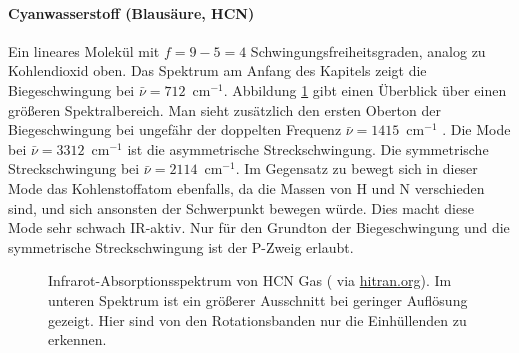 \paragraph{Cyanwasserstoff (Blausäure, HCN)}  
\begin{marginfigure}
\end{marginfigure}
Ein lineares Molekül mit $f=9 - 5 = 4$ Schwingungsfreiheitsgraden, analog zu Kohlendioxid oben. Das Spektrum am Anfang des Kapitels zeigt die Biegeschwingung bei $\bar{\nu} = 712$~cm$^{-1}$.  Abbildung \ref{fig:vib_hcn_all} gibt einen Überblick über einen größeren Spektralbereich. Man sieht zusätzlich den 
ersten Oberton der Biegeschwingung bei ungefähr der doppelten Frequenz  $\bar{\nu} = 1415$~cm$^{-1}$
. Die Mode bei  $\bar{\nu} = 3312$~cm$^{-1}$ ist die  asymmetrische Streckschwingung. Die symmetrische Streckschwingung  bei $\bar{\nu} = 2114$~cm$^{-1}$.
 Im Gegensatz zu  bewegt sich in dieser Mode das Kohlenstoffatom ebenfalls, da die Massen von H und N verschieden sind, und sich ansonsten der  Schwerpunkt bewegen würde. Dies macht diese Mode sehr schwach IR-aktiv.  Nur für den Grundton der Biegeschwingung und die  symmetrische Streckschwingung ist der P-Zweig erlaubt.

\begin{figure}
\caption{Infrarot-Absorptionsspektrum von HCN Gas  (\cite{Maki_1995_HCN} via \href{https://hitran.org}{hitran.org}). Im unteren Spektrum ist ein größerer Ausschnitt bei geringer Auflösung gezeigt. Hier sind von den Rotationsbanden nur die Einhüllenden zu erkennen.
\label{fig:vib_hcn_all}}
\end{figure}








\printbibliography[segment=\therefsegment,heading=subbibliography]
